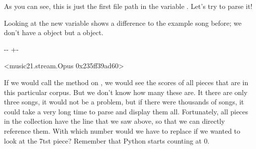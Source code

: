 \documentclass[letterpaper,10pt,english]{sphinxmanual}
\newlength\nbsphinxcodecellspacing
\begin{document}
As you can see, this is just the first file path in the variable . Let’s try to parse it!

{
\begin{sphinxVerbatim}[commandchars=\\\{\}]
\llap{\color{nbsphinxin}[15]:\,\hspace{\fboxrule}\hspace{\fboxsep}}  \PYG{p}{[}\PYG{p}{]}
\end{sphinxVerbatim}
}

Looking at the new variable  shows a difference to the example song before; we don’t have a  object but a  object.

{
\begin{sphinxVerbatim}[commandchars=\\\{\}]
\llap{\color{nbsphinxin}[16]:\,\hspace{\fboxrule}\hspace{\fboxsep}}
\end{sphinxVerbatim}
}

{

\kern-\sphinxverbatimsmallskipamount\kern-\baselineskip
\kern+\FrameHeightAdjust\kern-\fboxrule
\vspace{\nbsphinxcodecellspacing}

\begin{sphinxVerbatim}[commandchars=\\\{\}]
\llap{\color{nbsphinxout}[16]:\,\hspace{\fboxrule}\hspace{\fboxsep}}<music21.stream.Opus 0x235ff39ad60>
\end{sphinxVerbatim}
}

If we would call the  method on , we would see the scores of all pieces that are in this particular corpus. But we don’t know how many these are. It there are only three songs, it would not be a problem, but if there were thousands of songs, it could take a very long time to parse and display them all. Fortunately, all pieces in the collection have the  line that we saw above, so that we can directly reference them. With which number would we have to replace
 if we wanted to look at the 7tst piece? Remember that Python starts counting at 0.
\end{document}

